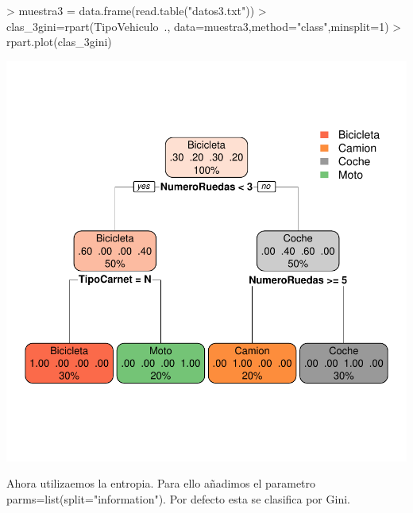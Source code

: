 \documentclass [a4paper] {article}
\begin{document}
\begin{center}
\begin{Schunk}
\begin{Sinput}
> muestra3 = data.frame(read.table("datos3.txt"))
> clas_3gini=rpart(TipoVehiculo~., data=muestra3,method="class",minsplit=1)
> rpart.plot(clas_3gini)
\end{Sinput}
\end{Schunk}
\includegraphics{entrega2-rpart_gini}
\end{center}

Ahora utilizaemos la entropia. 
Para ello añadimos el parametro parms=list(split="information").
Por defecto esta se clasifica por Gini.
\end{document}
